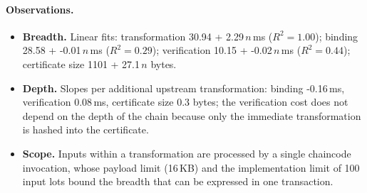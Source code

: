 \paragraph{Observations.}
\begin{itemize}
  \item \textbf{Breadth.} Linear fits: transformation 30.94 + 2.29\,$n$\,ms ($R^2 = 1.00$); binding
        28.58 + -0.01\,$n$\,ms ($R^2 = 0.29$); verification 10.15 + -0.02\,$n$\,ms
        ($R^2 = 0.44$); certificate size 1101 + 27.1\,$n$ bytes.
  \item \textbf{Depth.} Slopes per additional upstream transformation: binding -0.16\,ms, verification
        0.08\,ms, certificate size 0.3 bytes; the verification cost does not depend on the depth of
        the chain because only the immediate transformation is hashed into the certificate.
  \item \textbf{Scope.} Inputs within a transformation are processed by a single chaincode invocation, whose payload limit
        (16\,KB) and the implementation limit of 100 input lots bound the breadth that can be expressed in one transaction.
\end{itemize}
